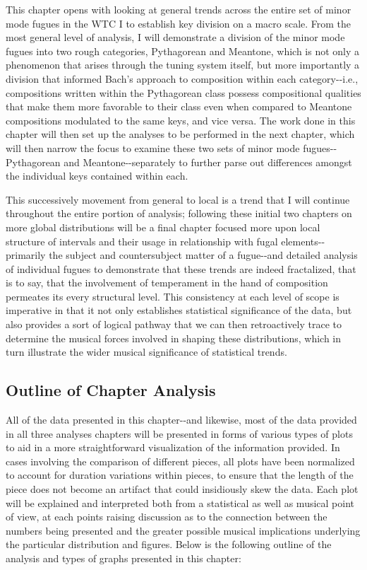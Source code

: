 This chapter opens with looking at general trends across the entire set
of minor mode fugues in the WTC I to establish key division on a macro
scale. From the most general level of analysis, I will demonstrate a
division of the minor mode fugues into two rough categories, Pythagorean
and Meantone, which is not only a phenomenon that arises through the
tuning system itself, but more importantly a division that informed
Bach's approach to composition within each category-\/-i.e.,
compositions written within the Pythagorean class possess compositional
qualities that make them more favorable to their class even when
compared to Meantone compositions modulated to the same keys, and vice
versa. The work done in this chapter will then set up the analyses to be
performed in the next chapter, which will then narrow the focus to
examine these two sets of minor mode fugues-\/-Pythagorean and
Meantone-\/-separately to further parse out differences amongst the
individual keys contained within each.

This successively movement from general to local is a trend that I will
continue throughout the entire portion of analysis; following these
initial two chapters on more global distributions will be a final
chapter focused more upon local structure of intervals and their usage
in relationship with fugal elements-\/-primarily the subject and
countersubject matter of a fugue-\/-and detailed analysis of individual
fugues to demonstrate that these trends are indeed fractalized, that is
to say, that the involvement of temperament in the hand of composition
permeates its every structural level. This consistency at each level of
scope is imperative in that it not only establishes statistical
significance of the data, but also provides a sort of logical pathway
that we can then retroactively trace to determine the musical forces
involved in shaping these distributions, which in turn illustrate the
wider musical significance of statistical trends.

\subsection{Outline of Chapter
Analysis}\label{outline-of-chapter-analysis}

All of the data presented in this chapter-\/-and likewise, most of the
data provided in all three analyses chapters will be presented in forms
of various types of plots to aid in a more straightforward visualization
of the information provided. In cases involving the comparison of
different pieces, all plots have been normalized to account for duration
variations within pieces, to ensure that the length of the piece does
not become an artifact that could insidiously skew the data. Each plot
will be explained and interpreted both from a statistical as well as
musical point of view, at each points raising discussion as to the
connection between the numbers being presented and the greater possible
musical implications underlying the particular distribution and figures.
Below is the following outline of the analysis and types of graphs
presented in this chapter:

